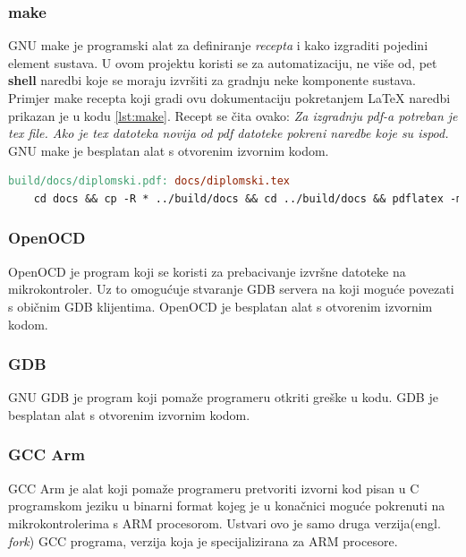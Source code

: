 \documentclass[times, utf8, diplomski]{diplomski}
\begin{document}
\subsubsection{make}
GNU make je programski alat za definiranje \textit{recepta} i kako izgraditi pojedini element sustava. U ovom projektu koristi se za automatizaciju, ne više od, pet \textbf{shell} naredbi koje se moraju izvršiti za gradnju neke komponente sustava. Primjer make recepta koji gradi ovu dokumentaciju pokretanjem \LaTeX \cite{ungar2002uvod} naredbi prikazan je u kodu \ref{lst:make}. Recept se čita ovako: \textit{Za izgradnju pdf-a potreban je tex file. Ako je tex datoteka novija od pdf datoteke pokreni naredbe koje su ispod.} GNU make je besplatan alat s otvorenim izvornim kodom.

\begin{lstlisting}[language=make, label={lst:make}, caption={Gradnja dokumentacije korištenjem make recepta}]
build/docs/diplomski.pdf: docs/diplomski.tex
	cd docs && cp -R * ../build/docs && cd ../build/docs && pdflatex -mltex diplomski.tex && bibtex diplomski && pdflatex -mltex diplomski.tex
\end{lstlisting}

\subsubsection{OpenOCD}
OpenOCD \cite{openocd} je program koji se koristi za prebacivanje izvršne datoteke na mikrokontroler. Uz to omogućuje stvaranje GDB servera na koji moguće povezati s običnim GDB klijentima. OpenOCD je besplatan alat s otvorenim izvornim kodom.

\subsubsection{GDB}
GNU GDB \cite{gdb} je program koji pomaže programeru otkriti greške u kodu. GDB je besplatan alat s otvorenim izvornim kodom.

\subsubsection{GCC Arm}
GCC Arm \cite{armgcc} je alat koji pomaže programeru pretvoriti izvorni kod pisan u C programskom jeziku u binarni format kojeg je u konačnici moguće pokrenuti na mikrokontrolerima s ARM procesorom. Ustvari ovo je samo druga verzija(engl. \textit{fork}) GCC \cite{gcc} programa, verzija koja je specijalizirana za ARM procesore.
\end{document}
